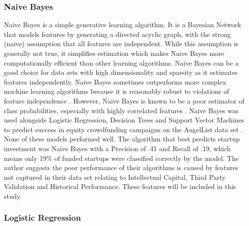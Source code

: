 \documentclass[../thesis/thesis.tex]{subfiles}
\begin{document}
\subsubsection{Naive Bayes}

Naive Bayes is a simple generative learning algorithm. It is a Bayesian Network that models features by generating a directed acyclic graph, with the strong (naive) assumption that all features are independent. While this assumption is generally not true, it simplifies estimation which makes Naive Bayes more computationally efficient than other learning algorithms. Naive Bayes can be a good choice for data sets with high dimensionality and sparsity as it estimates features independently. Naive Bayes sometimes outperforms more complex machine learning algorithms because it is reasonably robust to violations of feature independence \cite{kotsiantis2007}. However, Naive Bayes is known to be a poor estimator of class probabilities, especially with highly correlated features \cite{niculescu2005}. Naive Bayes was used alongside Logistic Regression, Decision Trees and Support Vector Machines to predict success in equity crowdfunding campaigns on the AngelList data set \cite{beckwith2016}. None of these models performed well. The algorithm that best predicts startup investment was Naive Bayes with a Precision of .41 and Recall of .19, which means only 19\% of funded startups were classified correctly by the model. The author suggests the poor performance of their algorithms is caused by features not captured in their data set relating to Intellectual Capital, Third Party Validation and Historical Performance. These features will be included in this study.

\subsubsection{Logistic Regression}
\end{document}
